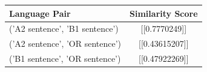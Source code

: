 \begin{tabular}{|l|c|}
\hline
Language Pair & Similarity Score \\
\hline
('A2 sentence', 'B1 sentence') & [[0.7770249]] \\
('A2 sentence', 'OR sentence') & [[0.43615207]] \\
('B1 sentence', 'OR sentence') & [[0.47922269]] \\
\hline
\end{tabular}

